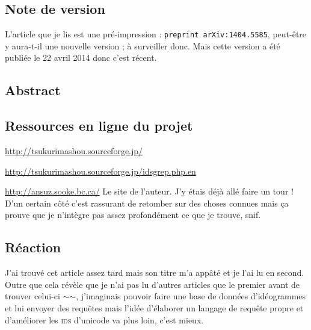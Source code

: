 \subsection{Note de version}
L'article que je lis est une pré-impression : \texttt{preprint arXiv:1404.5585}, peut-être y aura-t-il une nouvelle version ; à surveiller donc. Mais cette version a été publiée le 22 avril 2014 donc c'est récent.
\subsection{Abstract}
\subsection{Ressources en ligne du projet}
\url{http://tsukurimashou.sourceforge.jp/}\par
\url{http://tsukurimashou.sourceforge.jp/idsgrep.php.en}\par
\url{http://ansuz.sooke.bc.ca/} Le site de l'auteur. J'y étais déjà allé faire un tour ! D'un certain côté c'est rassurant de retomber sur des choses connues mais ça prouve que je n'intègre pas assez profondément ce que je trouve, snif.
\subsection{Réaction}
J'ai trouvé cet article assez tard mais son titre m'a appâté et je l'ai lu en second. Outre que cela révèle que je n'ai pas lu d'autres articles que le premier avant de trouver celui-ci $\sim$$\sim$, j'imaginais pouvoir faire une base de données d'idéogrammes et lui envoyer des requêtes mais l'idée d'élaborer un langage de requête propre et d'améliorer les \textsc{ids} d'unicode va plus loin, c'est mieux.

